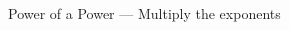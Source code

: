 \documentclass[12pt, a4paper, addpoints]{exam}
\newcommand{\ts}{\vspace{16mm}}
\newcommand{\ms}{\vspace{20mm}}
\begin{document}
\begin{questions}
\begin{multicols}{5}
\end{multicols}
\verticalspace

\ts


\question Power of a Power — Multiply the exponents
\setlength{\columnsep}{20pt} 
\begin{multicols}{6}
\end{multicols}

\ts









\end{questions}
\end{document}
